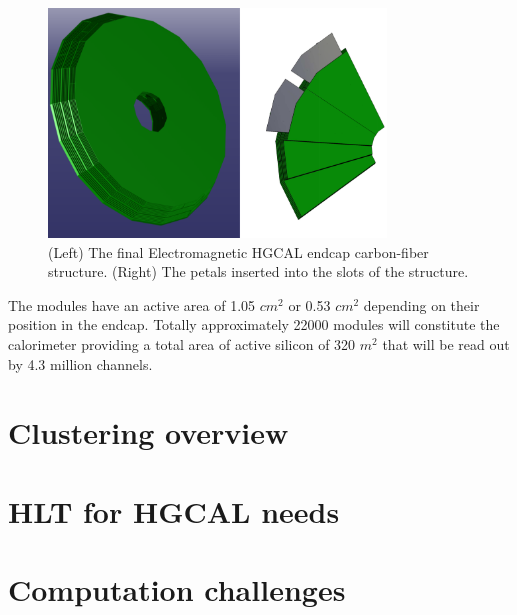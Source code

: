 \begin{figure}
\centerline{\includegraphics[width=0.8\textwidth]{intro/hgcalStruct.png}}
\caption{(Left) The final Electromagnetic HGCAL endcap carbon-fiber structure. (Right) The petals inserted into the slots of the structure.}
\label{hgcalStruct}
\end{figure}

The modules have an active area of 1.05 $\unit{cm^2}$ or 0.53 $\unit{cm^2}$ depending on their position in the endcap. Totally approximately 22000 modules will constitute the calorimeter providing a total area of active silicon of 320 $\unit{m^2}$ that will be read out by 4.3 million channels.\\


\section{Clustering overview}\label{sec:hgcal_clustering}

\section{HLT for HGCAL needs}

\section{Computation challenges}

